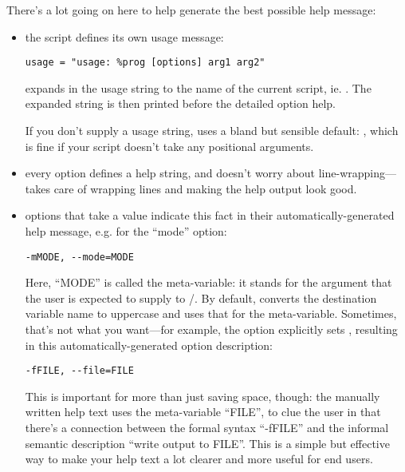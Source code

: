 There's a lot going on here to help  generate the
best possible help message:

\begin{itemize}
\item the script defines its own usage message:

\begin{verbatim}
usage = "usage: %prog [options] arg1 arg2"
\end{verbatim}

 expands  in the usage string to the name of the
current script, ie. .  The
expanded string is then printed before the detailed option help.

If you don't supply a usage string,  uses a bland but
sensible default: , which is fine if your
script doesn't take any positional arguments.

\item every option defines a help string, and doesn't worry about 
line-wrapping--- takes care of wrapping lines and 
making the help output look good.

\item options that take a value indicate this fact in their
automatically-generated help message, e.g. for the ``mode'' option:

\begin{verbatim}
-mMODE, --mode=MODE
\end{verbatim}

Here, ``MODE'' is called the meta-variable: it stands for the argument
that the user is expected to supply to
/.  By default, 
converts the destination variable name to uppercase and uses that for
the meta-variable.  Sometimes, that's not what you want---for
example, the  option explicitly sets
, resulting in this automatically-generated
option description:

\begin{verbatim}
-fFILE, --file=FILE
\end{verbatim}

This is important for more than just saving space, though: the
manually written help text uses the meta-variable ``FILE'', to clue
the user in that there's a connection between the formal syntax
``-fFILE'' and the informal semantic description ``write output to
FILE''.  This is a simple but effective way to make your help text a
lot clearer and more useful for end users.
\end{itemize}

